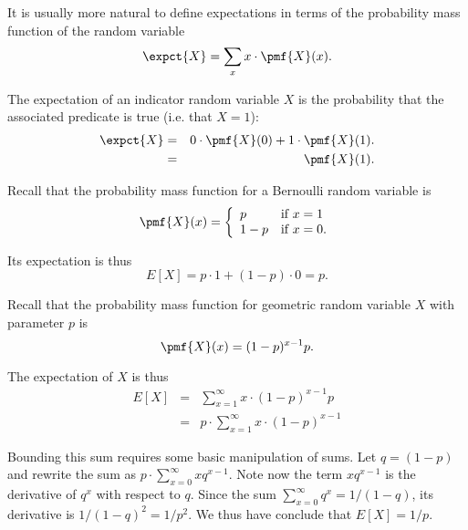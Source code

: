 \begin{flex}
\label{grp:grm:probability::expectation::usually}

\begin{gram}
\label{grm:probability::expectation::usually}
\begin{gram}
It is usually more natural to define expectations in terms of the
probability mass function of the random variable
\[
\expct{X} = \sum_{x} x \cdot \pmf{X}(x).
\] 
\end{gram}
\begin{example}
The expectation of an indicator random variable $X$ is
the probability that the associated predicate is true (i.e. that
$X= 1$):
\begin{eqnarray*}
\expct{X} 
& = & 0 \cdot \pmf{X}(0) + 1 \cdot \pmf{X}(1).
\\
& = & \pmf{X}(1).
\end{eqnarray*}
\end{example}

\end{gram}

\begin{example}
\label{xmpl:probability::expectation::recall}
Recall that the probability mass function for a Bernoulli random
variable is  
\[
\pmf{X}(x) = 
\left\{
\begin{array}{ll}
p & \mbox{if}~x = 1
\\
1-p & \mbox{if}~x = 0.
\end{array}
\right.
\]

Its expectation is thus
\[
E[X] = p \cdot 1 + (1-p) \cdot 0 = p.
\]

\end{example}

\begin{example}
\label{xmpl:probability::expectation::probability}
Recall that the probability mass function for geometric random
variable $X$ with parameter $p$ is 
\[
\pmf{X}(x) = (1-p)^{x-1} p.
\]

The expectation of $X$ is thus
\[
\begin{array}{lll}
E[X] & = & \displaystyle\sum_{x = 1}^{\infty}{x \cdot (1-p)^{x-1} p}
\\
& = &  p\cdot \displaystyle\sum_{x = 1}^{\infty}{x \cdot (1-p)^{x-1}}
\end{array}
\]

Bounding this sum requires some basic manipulation of sums.
Let $q = (1-p)$ and rewrite the sum as $p \cdot \sum_{x = 0}^{\infty}{xq^{x-1}}$.
Note now the term $xq^{x-1}$ is the derivative of $q^{x}$ with respect
to $q$.
Since the sum $\sum_{x=0}^{\infty}{q^x} = 1/(1-q)$, its derivative is
$1/(1-q)^2 = 1/p^2$.
We thus have conclude that $E[X] = 1/p$.


\end{example}
\end{flex}
